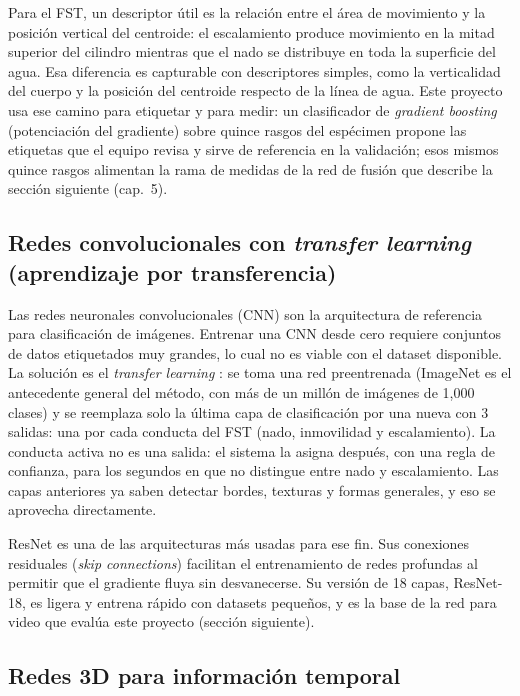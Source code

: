 Para el FST, un descriptor útil es la relación entre el área de movimiento y la posición
vertical del centroide: el escalamiento produce movimiento en la mitad superior del
cilindro mientras que el nado se distribuye en toda la superficie del agua. Esa
diferencia es capturable con descriptores simples, como la verticalidad del cuerpo y la
posición del centroide respecto de la línea de agua. Este proyecto
usa ese camino para etiquetar y para medir: un clasificador de
\textit{gradient boosting} (potenciación del gradiente) sobre quince rasgos del
espécimen propone las etiquetas que el equipo revisa y sirve de referencia en la validación; esos mismos quince rasgos
alimentan la rama de medidas de la red de fusión que describe la sección siguiente (cap.~5).

\subsection{Redes convolucionales con \textit{transfer learning} (aprendizaje por transferencia)}

Las redes neuronales convolucionales (CNN) \cite{lecun1998} son la arquitectura de referencia para clasificación de
imágenes. Entrenar una CNN desde cero requiere conjuntos de datos etiquetados muy grandes,
lo cual no es viable con el dataset disponible. La solución es el \textit{transfer
learning} \cite{pan2010}: se toma una red preentrenada (ImageNet es el antecedente general del método, con más de un millón
de imágenes de 1{,}000 clases) y se reemplaza solo la última capa de clasificación por
una nueva con 3 salidas: una por cada conducta del FST (nado, inmovilidad y escalamiento).
La conducta activa no es una salida: el sistema la asigna después, con una regla de
confianza, para los segundos en que no distingue entre nado y escalamiento. Las capas anteriores ya saben detectar bordes,
texturas y formas generales, y eso se aprovecha directamente.

ResNet \cite{he2016} es una de las arquitecturas más usadas para ese fin. Sus
conexiones residuales (\textit{skip connections}) facilitan el entrenamiento de redes
profundas al permitir que el gradiente fluya sin desvanecerse. Su versión de 18 capas,
ResNet-18, es ligera y entrena rápido con datasets pequeños, y es la base de la red
para video que evalúa este proyecto (sección siguiente).

\subsection{Redes 3D para información temporal}


